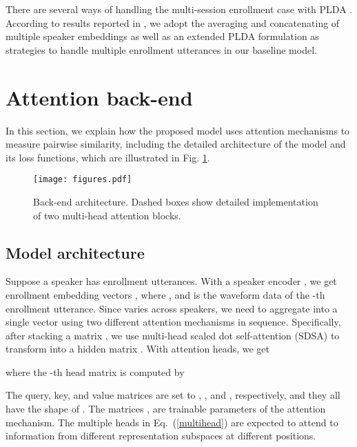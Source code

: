 \documentclass{article}
\begin{document}
There are several ways of handling the multi-session enrollment case with PLDA \cite{kong_plda, ville_plda}. According to results reported in \cite{kong_plda, ville_plda}, we adopt the averaging and concatenating of multiple speaker embeddings as well as an extended PLDA formulation \cite{ville_plda} as strategies to handle multiple enrollment utterances in our baseline model.
\vspace{-1mm}




\section{Attention back-end}
\vspace{-1mm}
\label{sec:pagestyle}

In this section, we explain how the proposed model uses attention mechanisms to measure pairwise similarity, including the detailed architecture of the model and its loss functions, which are illustrated in Fig. \ref{fig:back-end}.
\vspace{-1mm}

\begin{figure}[t]
  \centering
  \texttt{[image: figures.pdf]}
\caption{Back-end architecture. Dashed boxes show detailed implementation of two multi-head attention blocks.}
  \label{fig:back-end}
\end{figure}

\subsection{Model architecture}
\vspace{-1mm}




Suppose a speaker has  enrollment utterances. With a speaker encoder ,  we get  enrollment embedding vectors , where , and  is the waveform data of the -th enrollment utterance.
Since  varies across speakers, we need to aggregate  into a single vector  using two different attention mechanisms in sequence. Specifically, after stacking a matrix , we use multi-head scaled dot self-attention (SDSA) \cite{Vaswani2017-Attention} to transform  into a hidden matrix . With  attention heads, we get

where the -th head matrix  is computed by

The query, key, and value matrices are set to , , and , respectively, and they all have the shape of  . The matrices ,  are trainable parameters of the attention mechanism. 
The multiple heads in Eq.\ (\ref{multihead}) are expected to attend to information from different representation subspaces at different positions.
\end{document}

